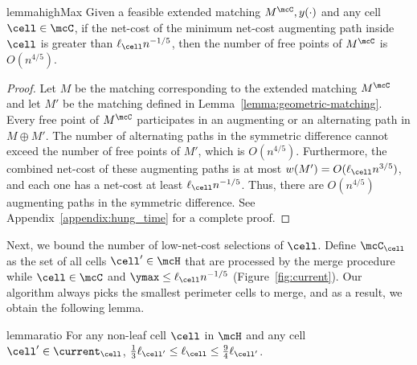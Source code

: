 \begin{restatable}{lemma}{highMax}\label{lemma:high-max}
    Given a feasible extended matching $M^\mcC, y(\cdot)$ and any cell $\cell\in\mcC$, if the net-cost of the minimum net-cost augmenting path inside $\cell$ is greater than $\ell_\cell n^{-1/5}$, then the number of free points of $M^\mcC$ is $O(n^{4/5})$.
\end{restatable}
\begin{proof}
    Let $M$ be the matching corresponding to the extended matching $M^\mcC$ and let $M'$ be the matching defined in Lemma~\ref{lemma:geometric-matching}. Every free point of $M^\mcC$ participates in an augmenting or an alternating path in $M\oplus M'$. The number of alternating paths in the symmetric difference cannot exceed the number of free points of $M'$, which is $O(n^{4/5})$. Furthermore, the combined net-cost of these augmenting paths is at most $w(M')=O(\ell_\cell n^{3/5})$, and each one has a net-cost at least $\ell_\cell n^{-1/5}$. Thus, there are $O(n^{4/5})$ augmenting paths in the symmetric difference. See Appendix~\ref{appendix:hung_time} for a complete proof.
\end{proof}

Next, we bound the number of low-net-cost selections of $\cell$. Define $\mcC_\cell$ as the set of all cells $\cell'\in\mcH$ that are processed by the merge procedure while $\cell\in\mcC$ and $\ymax\le \ell_\cell n^{-1/5}$ (Figure~\ref{fig:current}). Our algorithm always picks the smallest perimeter cells to merge, and as a result, we obtain the following lemma.
\begin{restatable}{lemma}{ratio}
\label{lemma:ratio}
For any non-leaf cell $\cell$ in $\mcH$ and any cell $\cell'\in\current_\cell$, $\frac{1}{3}\ell_{\cell'}\le \ell_\cell \le \frac{9}{4}\ell_{\cell'}$.
\end{restatable}


